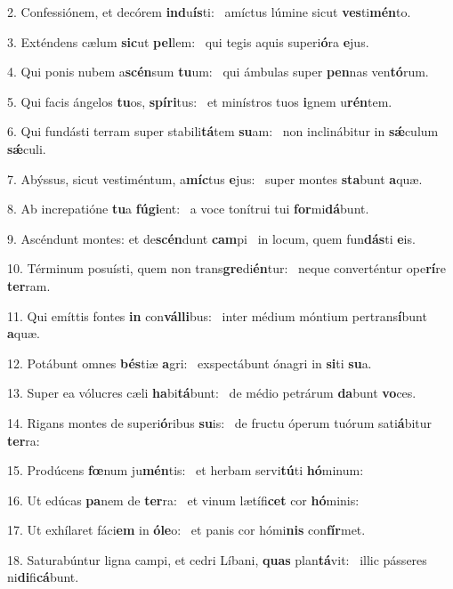 2. Confessiónem, et decórem \textbf{ind}u\textbf{ís}ti: \ast\  amíctus lúmine sicut \textbf{ves}ti\textbf{mén}to.\

3. Exténdens cælum \textbf{sic}ut \textbf{pel}lem: \ast\  qui tegis aquis superi\textbf{ó}ra \textbf{e}jus.\

4. Qui ponis nubem a\textbf{scén}sum \textbf{tu}um: \ast\  qui ámbulas super \textbf{pen}nas ven\textbf{tó}rum.\

5. Qui facis ángelos \textbf{tu}os, \textbf{spí}\textbf{ri}tus: \ast\  et minístros tuos \textbf{i}gnem u\textbf{rén}tem.\

6. Qui fundásti terram super stabili\textbf{tá}tem \textbf{su}am: \ast\  non inclinábitur in \textbf{sǽ}culum \textbf{sǽ}culi.\

7. Abýssus, sicut vestiméntum, a\textbf{míc}tus \textbf{e}jus: \ast\  super montes \textbf{sta}bunt \textbf{a}quæ.\

8. Ab increpatióne \textbf{tu}a \textbf{fú}\textbf{gi}ent: \ast\  a voce tonítrui tui \textbf{for}mi\textbf{dá}bunt.\

9. Ascéndunt montes: et de\textbf{scén}dunt \textbf{cam}pi \ast\  in locum, quem fun\textbf{dás}ti \textbf{e}is.\

10. Términum posuísti, quem non trans\textbf{gre}di\textbf{én}tur: \ast\  neque converténtur ope\textbf{rí}re \textbf{ter}ram.\

11. Qui emíttis fontes \textbf{in} con\textbf{vál}\textbf{li}bus: \ast\  inter médium móntium pertrans\textbf{í}bunt \textbf{a}quæ.\

12. Potábunt omnes \textbf{bés}tiæ \textbf{a}gri: \ast\  exspectábunt ónagri in \textbf{si}ti \textbf{su}a.\

13. Super ea vólucres cæli \textbf{ha}bi\textbf{tá}bunt: \ast\  de médio petrárum \textbf{da}bunt \textbf{vo}ces.\

14. Rigans montes de superi\textbf{ó}ribus \textbf{su}is: \ast\  de fructu óperum tuórum sati\textbf{á}bitur \textbf{ter}ra:\

15. Prodúcens \textbf{fœ}num ju\textbf{mén}tis: \ast\  et herbam servi\textbf{tú}ti \textbf{hó}minum:\

16. Ut edúcas \textbf{pa}nem de \textbf{ter}ra: \ast\  et vinum lætífi\textbf{cet} cor \textbf{hó}minis:\

17. Ut exhílaret fáci\textbf{em} in \textbf{ó}\textbf{le}o: \ast\  et panis cor hómi\textbf{nis} con\textbf{fír}met.\

18. Saturabúntur ligna campi, et cedri Líbani, \textbf{quas} plan\textbf{tá}vit: \ast\  illic pásseres ni\textbf{di}fi\textbf{cá}bunt.\


